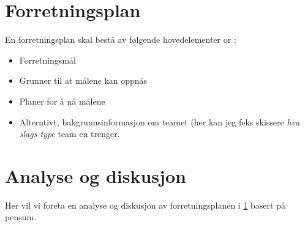 \chapter{Forretningsplan}
\label{del1}

En forretningsplan skal bestå av følgende hovedelementer
\cite{wiki:business.plan} or \cite{wiki:business.plan}:

\begin{itemize}
    \item Forretningsmål
    \item Grunner til at målene kan oppnås
    \item Planer for å nå målene
    \item Alterntivt, bakgrunnsinformasjon om teamet (her kan jeg feks skissere
        \textit{hva slags type} team en trenger.
\end{itemize}

\chapter{Analyse og diskusjon}

Her vil vi foreta en analyse og diskusjon av forretningsplanen i \ref{del1}
basert på pensum.
